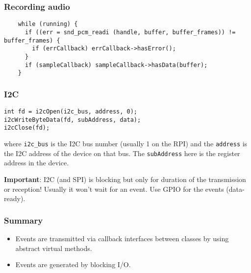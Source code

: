 \documentclass[xcolor=dvipsnames]{beamer}
\begin{document}
\begin{frame}[fragile]
    \frametitle{Recording audio}
\begin{verbatim}
    while (running) {
      if ((err = snd_pcm_readi (handle, buffer, buffer_frames)) != buffer_frames) {
        if (errCallback) errCallback->hasError();
      }
      if (sampleCallback) sampleCallback->hasData(buffer);
    }
   \end{verbatim}
\end{frame}



\begin{frame}[fragile]
    \frametitle{I2C}
\begin{verbatim}
int fd = i2cOpen(i2c_bus, address, 0);
i2cWriteByteData(fd, subAddress, data);
i2cClose(fd);
\end{verbatim}
where \texttt{i2c\_bus} is the I2C bus number (usually 1 on the RPI)
and the \texttt{address} is the I2C address of the device on that bus.
The \texttt{subAddress} here is the register address in the device.


\textbf{Important}: I2C (and SPI) is blocking but only for duration of the transmission or reception!
Usually it won't wait for an event. Use GPIO for the events (data-ready).
\end{frame}

\begin{frame}[fragile]
    \frametitle{Summary}

    \begin{itemize}
        \item Events are transmitted via callback interfaces between classes by using abstract virtual methods.
        \item Events are generated by blocking I/O.
    \end{itemize}
\end{frame}
\end{document}
